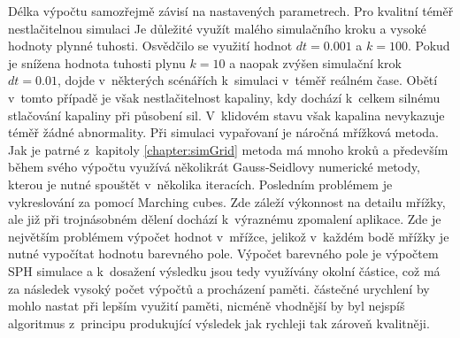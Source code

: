 Délka výpočtu samozřejmě závisí na nastavených parametrech. Pro kvalitní téměř nestlačitelnou simulaci Je důležité využít malého simulačního kroku a vysoké hodnoty plynné tuhosti. Osvědčilo se využití hodnot $dt=0.001$ a $k=100$. Pokud je snížena hodnota tuhosti plynu $k=10$ a naopak zvýšen simulační krok $dt=0.01$, dojde v~některých scénářích k~simulaci v~téměř reálném čase. Obětí v~tomto případě je však nestlačitelnost kapaliny, kdy dochází k~celkem silnému stlačování kapaliny při působení sil. V~klidovém stavu však kapalina nevykazuje téměř žádné abnormality. Při simulaci vypařovaní je náročná mřížková metoda. Jak je patrné z~kapitoly \ref{chapter:simGrid} metoda má mnoho kroků a především během svého výpočtu využívá několikrát Gauss-Seidlovy numerické metody, kterou je nutné spouštět v~několika iteracích. Posledním problémem je vykreslování za pomocí Marching cubes. Zde záleží výkonnost na detailu mřížky, ale již při trojnásobném dělení dochází k~výraznému zpomalení aplikace. Zde je největším problémem výpočet hodnot v~mřížce, jelikož v~každém bodě mřížky je nutné vypočítat hodnotu barevného pole. Výpočet barevného pole je výpočtem SPH simulace a k~dosažení výsledku jsou tedy využívány okolní částice, což má za následek vysoký počet výpočtů a procházení paměti. částečné urychlení by mohlo nastat při lepším využití paměti, nicméně vhodnější by byl nejspíš algoritmus z~principu produkující výsledek jak rychleji tak zároveň kvalitněji.

